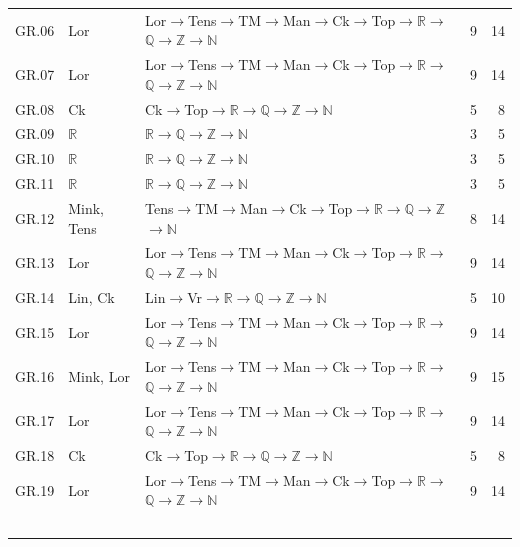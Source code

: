 {\begin{longtable}{l p{4.6cm} p{7.4cm} r r}
GR.06 & \textsf{Lor} & \textsf{Lor}$\to$\textsf{Tens}$\to$\textsf{TM}$\to$\textsf{Man}$\to$\textsf{Ck}$\to$\textsf{Top}$\to$$\mathbb R$$\to$$\mathbb Q$$\to$$\mathbb Z$$\to$$\mathbb N$ & 9 & 14 \\
GR.07 & \textsf{Lor} & \textsf{Lor}$\to$\textsf{Tens}$\to$\textsf{TM}$\to$\textsf{Man}$\to$\textsf{Ck}$\to$\textsf{Top}$\to$$\mathbb R$$\to$$\mathbb Q$$\to$$\mathbb Z$$\to$$\mathbb N$ & 9 & 14 \\
GR.08 & \textsf{Ck} & \textsf{Ck}$\to$\textsf{Top}$\to$$\mathbb R$$\to$$\mathbb Q$$\to$$\mathbb Z$$\to$$\mathbb N$ & 5 & 8 \\
GR.09 & $\mathbb R$ & $\mathbb R$$\to$$\mathbb Q$$\to$$\mathbb Z$$\to$$\mathbb N$ & 3 & 5 \\
GR.10 & $\mathbb R$ & $\mathbb R$$\to$$\mathbb Q$$\to$$\mathbb Z$$\to$$\mathbb N$ & 3 & 5 \\
GR.11 & $\mathbb R$ & $\mathbb R$$\to$$\mathbb Q$$\to$$\mathbb Z$$\to$$\mathbb N$ & 3 & 5 \\
GR.12 & \textsf{Mink}, \textsf{Tens} & \textsf{Tens}$\to$\textsf{TM}$\to$\textsf{Man}$\to$\textsf{Ck}$\to$\textsf{Top}$\to$$\mathbb R$$\to$$\mathbb Q$$\to$$\mathbb Z$$\to$$\mathbb N$ & 8 & 14 \\
GR.13 & \textsf{Lor} & \textsf{Lor}$\to$\textsf{Tens}$\to$\textsf{TM}$\to$\textsf{Man}$\to$\textsf{Ck}$\to$\textsf{Top}$\to$$\mathbb R$$\to$$\mathbb Q$$\to$$\mathbb Z$$\to$$\mathbb N$ & 9 & 14 \\
GR.14 & \textsf{Lin}, \textsf{Ck} & \textsf{Lin}$\to$\textsf{Vr}$\to$$\mathbb R$$\to$$\mathbb Q$$\to$$\mathbb Z$$\to$$\mathbb N$ & 5 & 10 \\
GR.15 & \textsf{Lor} & \textsf{Lor}$\to$\textsf{Tens}$\to$\textsf{TM}$\to$\textsf{Man}$\to$\textsf{Ck}$\to$\textsf{Top}$\to$$\mathbb R$$\to$$\mathbb Q$$\to$$\mathbb Z$$\to$$\mathbb N$ & 9 & 14 \\
GR.16 & \textsf{Mink}, \textsf{Lor} & \textsf{Lor}$\to$\textsf{Tens}$\to$\textsf{TM}$\to$\textsf{Man}$\to$\textsf{Ck}$\to$\textsf{Top}$\to$$\mathbb R$$\to$$\mathbb Q$$\to$$\mathbb Z$$\to$$\mathbb N$ & 9 & 15 \\
GR.17 & \textsf{Lor} & \textsf{Lor}$\to$\textsf{Tens}$\to$\textsf{TM}$\to$\textsf{Man}$\to$\textsf{Ck}$\to$\textsf{Top}$\to$$\mathbb R$$\to$$\mathbb Q$$\to$$\mathbb Z$$\to$$\mathbb N$ & 9 & 14 \\
GR.18 & \textsf{Ck} & \textsf{Ck}$\to$\textsf{Top}$\to$$\mathbb R$$\to$$\mathbb Q$$\to$$\mathbb Z$$\to$$\mathbb N$ & 5 & 8 \\
GR.19 & \textsf{Lor} & \textsf{Lor}$\to$\textsf{Tens}$\to$\textsf{TM}$\to$\textsf{Man}$\to$\textsf{Ck}$\to$\textsf{Top}$\to$$\mathbb R$$\to$$\mathbb Q$$\to$$\mathbb Z$$\to$$\mathbb N$ & 9 & 14 \\
$$
\end{longtable}}

